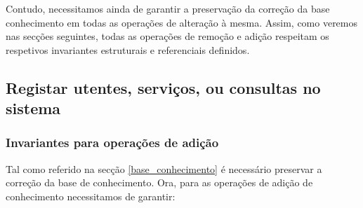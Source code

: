 \documentclass[
  oneside,
  10pt, a4paper,
  footinclude=true,
  headinclude=true,
  cleardoublepage=empty
]{scrbook}
\begin{document}
Contudo, necessitamos ainda de garantir a preservação da correção da base conhecimento em todas as operações de alteração à mesma. Assim, como veremos nas secções seguintes, todas as operações de remoção e adição respeitam os respetivos invariantes estruturais e referenciais definidos.

\subsection{Registar utentes, serviços, ou consultas no sistema}
\label{evolucao}

\subsubsection{Invariantes para operações de adição}
\label{invariantes_adicao}
Tal como referido na secção \ref{base_conhecimento} é necessário preservar a correção da base de conhecimento. Ora, para as operações de adição de conhecimento necessitamos de garantir:
\end{document}

